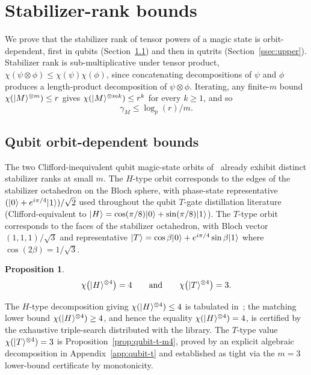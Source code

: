 \documentclass[11pt]{article}
\newtheorem{prop}[theorem]{Proposition}
\theoremstyle{definition}
\newcommand{\microspace}{\mspace{0.5mu}}
\newcommand{\ket}[1]{\lvert\microspace #1 \microspace \rangle}
\newcommand{\chiR}{\chi}
\begin{document}
	\section{Stabilizer-rank bounds}\label{sec:bounds}

	We prove that the stabilizer rank of tensor powers of a magic
	state is orbit-dependent, first in qubits
	(Section~\ref{ssec:qubit-bounds}) and then
	in qutrits (Section~\ref{ssec:upper}). Stabilizer rank is
	sub-multiplicative under tensor product,
	$\chiR(\psi \otimes \phi) \le \chiR(\psi) \chiR(\phi)$, since
	concatenating decompositions of $\psi$ and $\phi$ produces a
	length-product decomposition of $\psi \otimes \phi$. Iterating,
	any finite-$m$ bound $\chiR(\ket M^{\otimes m}) \le r$ gives
	$\chiR(\ket M^{\otimes mk}) \le r^k$ for every $k \ge 1$, and so
	\begin{equation}\label{eq:exponent-from-finite}
		\gamma_M \le \log_p(r) / m.
	\end{equation}

	\subsection{Qubit orbit-dependent bounds}\label{ssec:qubit-bounds}

	The two Clifford-inequivalent qubit magic-state orbits
	of~\cite{bravyi2005universal} already exhibit distinct stabilizer
	ranks at small $m$. The $H$-type orbit corresponds to the edges of
	the stabilizer octahedron on the Bloch sphere, with phase-state
	representative $(\ket 0 + e^{i\pi/4}\ket 1)/\sqrt 2$ used
	throughout the qubit $T$-gate distillation literature
	(Clifford-equivalent to
	$\ket{H} = \cos(\pi/8)\ket{0} + \sin(\pi/8)\ket{1}$). The
	$T$-type orbit corresponds to the faces of the stabilizer
	octahedron, with Bloch vector $(1, 1, 1)/\sqrt{3}$ and
	representative
	$\ket{T} = \cos\beta\ket{0} + e^{i\pi/4}\sin\beta\ket{1}$
	where $\cos(2\beta) = 1/\sqrt{3}$.

	\begin{prop}\label{prop:qubit-bounds}
		\begin{equation}\label{eq:qubit-bounds}
			\chiR\!\left(\ket{H}^{\otimes 4}\right) = 4
			\qquad\text{and}\qquad
			\chiR\!\left(\ket{T}^{\otimes 4}\right) = 3.
		\end{equation}
	\end{prop}

	The $H$-type decomposition giving
	$\chiR(\ket{H}^{\otimes 4}) \le 4$ is tabulated
	in~\cite{bravyi2016trading}; the matching lower bound
	$\chiR(\ket{H}^{\otimes 4}) \ge 4$, and hence the equality
	$\chiR(\ket{H}^{\otimes 4}) = 4$, is certified by the exhaustive
	triple-search distributed with the library.
	The $T$-type value $\chiR(\ket T^{\otimes 4}) = 3$ is
	Proposition~\ref{prop:qubit-t-m4}, proved by an explicit algebraic
	decomposition in Appendix~\ref{app:qubit-t} and established as tight via the $m=3$ lower-bound certificate by monotonicity.
\end{document}
